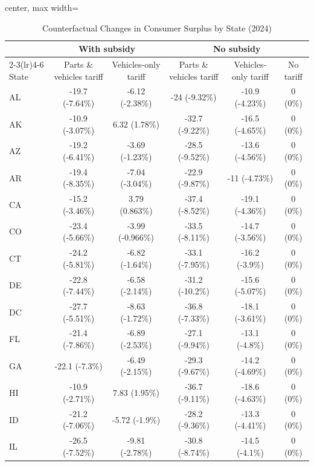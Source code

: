 \begin{table}[!htbp]
\centering
\caption{Counterfactual Changes in Consumer Surplus by State (2024)}
\label{tab:cs_by_state}
\scriptsize
\setlength{\tabcolsep}{2pt}
\renewcommand{\arraystretch}{0.92}

\begin{adjustbox}{center, max width=\textwidth}
\begin{threeparttable}
\begin{tabular}{lccccc}
\toprule
 & \multicolumn{2}{c}{With subsidy} & \multicolumn{3}{c}{No subsidy} \\
\cmidrule(lr){2-3}\cmidrule(lr){4-6}
State
& Parts \& vehicles tariff & Vehicles-only tariff
& Parts \& vehicles tariff & Vehicles-only tariff & No tariff \\
\midrule
AL & -19.7 (-7.64\%) & -6.12 (-2.38\%) & -24 (-9.32\%) & -10.9 (-4.23\%) & 0 (0\%) \\
AK & -10.9 (-3.07\%) & 6.32 (1.78\%) & -32.7 (-9.22\%) & -16.5 (-4.65\%) & 0 (0\%) \\
AZ & -19.2 (-6.41\%) & -3.69 (-1.23\%) & -28.5 (-9.52\%) & -13.6 (-4.56\%) & 0 (0\%) \\
AR & -19.4 (-8.35\%) & -7.04 (-3.04\%) & -22.9 (-9.87\%) & -11 (-4.73\%) & 0 (0\%) \\
CA & -15.2 (-3.46\%) & 3.79 (0.863\%) & -37.4 (-8.52\%) & -19.1 (-4.36\%) & 0 (0\%) \\
CO & -23.4 (-5.66\%) & -3.99 (-0.966\%) & -33.5 (-8.11\%) & -14.7 (-3.56\%) & 0 (0\%) \\
CT & -24.2 (-5.81\%) & -6.82 (-1.64\%) & -33.1 (-7.95\%) & -16.2 (-3.9\%) & 0 (0\%) \\
DE & -22.8 (-7.44\%) & -6.58 (-2.14\%) & -31.2 (-10.2\%) & -15.6 (-5.07\%) & 0 (0\%) \\
DC & -27.7 (-5.51\%) & -8.63 (-1.72\%) & -36.8 (-7.33\%) & -18.1 (-3.61\%) & 0 (0\%) \\
FL & -21.4 (-7.86\%) & -6.89 (-2.53\%) & -27.1 (-9.94\%) & -13.1 (-4.8\%) & 0 (0\%) \\
GA & -22.1 (-7.3\%) & -6.49 (-2.15\%) & -29.3 (-9.67\%) & -14.2 (-4.69\%) & 0 (0\%) \\
HI & -10.9 (-2.71\%) & 7.83 (1.95\%) & -36.7 (-9.11\%) & -18.6 (-4.63\%) & 0 (0\%) \\
ID & -21.2 (-7.06\%) & -5.72 (-1.9\%) & -28.2 (-9.36\%) & -13.3 (-4.41\%) & 0 (0\%) \\
IL & -26.5 (-7.52\%) & -9.81 (-2.78\%) & -30.8 (-8.74\%) & -14.5 (-4.1\%) & 0 (0\%) \\

\end{tabular}
\end{threeparttable}
\end{adjustbox}
\end{table}
